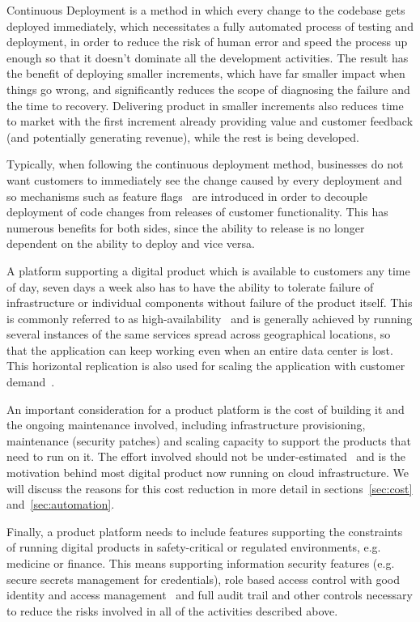 \documentclass[reprint,amsmath,amssymb,aps]{revtex4-1}
\begin{document}
Continuous Deployment is a method in which every change to the codebase gets deployed immediately, which necessitates a fully automated process of testing and deployment, in order to reduce the risk of human error and speed the process up enough so that it doesn’t dominate all the development activities. The result has the benefit of deploying smaller increments, which have far smaller impact when things go wrong, and significantly reduces the scope of diagnosing the failure and the time to recovery. Delivering product in smaller increments also reduces time to market with the first increment already providing value and customer feedback (and potentially generating revenue), while the rest is being developed.

Typically, when following the continuous deployment method, businesses do not want customers to immediately see the change caused by every deployment and so mechanisms such as feature flags~\cite{FeatureT95:online} are introduced in order to decouple deployment of code changes from releases of customer functionality. This has numerous benefits for both sides, since the ability to release is no longer dependent on the ability to deploy and vice versa.

A platform supporting a digital product which is available to customers any time of day, seven days a week also has to have the ability to tolerate failure of infrastructure or individual components without failure of the product itself. This is commonly referred to as high-availability~\cite{HighAvai70:online} and is generally achieved by running several instances of the same services spread across geographical locations, so that the application can keep working even when an entire data center is lost. This horizontal replication is also used for scaling the application with customer demand~\cite{WhatIsAm85:online}.

An important consideration for a product platform is the cost of building it and the ongoing maintenance involved, including infrastructure provisioning, maintenance (security patches) and scaling capacity to support the products that need to run on it. The effort involved should not be under-estimated~\cite{saaspdf24:online} and is the motivation behind most digital product now running on cloud infrastructure. We will discuss the reasons for this cost reduction in more detail in sections~\ref{sec:cost} and~\ref{sec:automation}.

Finally, a product platform needs to include features supporting the constraints of running digital products in safety-critical or regulated environments, e.g. medicine or finance. This means supporting information security features (e.g. secure secrets management for credentials), role based access control with good identity and access management~\cite{RoleBase56:online} and full audit trail and other controls necessary to reduce the risks involved in all of the activities described above.
\end{document}
